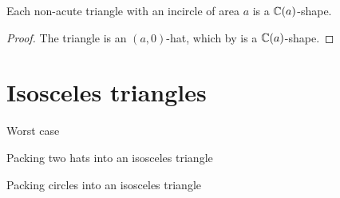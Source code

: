\documentclass[a4paper,style=print,bibliography=totoc,nexus,lnum,extramargin]{tubsbook}
\begin{document}
%

\begin{theorem}
    Each non-acute triangle with an incircle of area $a$ is a $\mathbb{C}(a)$-shape.
\end{theorem}

\begin{proof}
    The triangle is an $(a,0)$-hat, which by  is a $\mathbb{C}(a)$-shape.
\end{proof}

\section{Isosceles triangles}

Worst case

Packing two hats into an isosceles triangle

Packing circles into an isosceles triangle
\end{document}
